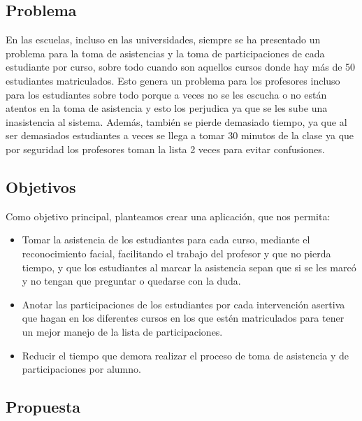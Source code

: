\documentclass{article}
\begin{document}
\subsection{Problema}
En las escuelas, incluso en las universidades, siempre se ha presentado un
problema para la toma de asistencias y la toma de participaciones de cada
estudiante por curso, sobre todo cuando son aquellos cursos donde hay más de 50
estudiantes matriculados. Esto genera un problema para los profesores incluso
para los estudiantes sobre todo porque a veces no se les escucha o no están
atentos en la toma de asistencia y esto los perjudica ya que se les sube una
inasistencia al sistema. Además, también se pierde demasiado tiempo, ya que al
ser demasiados estudiantes a veces se llega a tomar 30 minutos de la clase ya
que por seguridad los profesores toman la lista 2 veces para evitar confusiones.

\subsection{Objetivos}
Como objetivo principal, planteamos crear una aplicación, que nos permita:
\begin{itemize}
    \item Tomar la asistencia de los estudiantes para cada curso, mediante
    el reconocimiento facial, facilitando el trabajo del profesor y que no
    pierda tiempo, y que los estudiantes al marcar la asistencia sepan que si se
    les marcó y no tengan que preguntar o quedarse con la duda.
    \item Anotar las participaciones de los estudiantes por cada
    intervención asertiva que hagan en los diferentes cursos en los que estén
    matriculados para tener un mejor manejo de la lista de participaciones.
    \item Reducir el tiempo que demora realizar el proceso de toma de
    asistencia y de participaciones por alumno.
\end{itemize}

\subsection{Propuesta}
\end{document}
